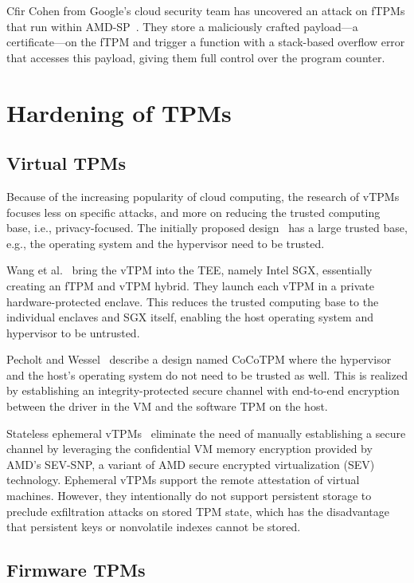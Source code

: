Cfir Cohen from Google's cloud security team has uncovered an attack on fTPMs that run within AMD-SP~\cite{cohen}. They store a maliciously crafted payload---a certificate---on the fTPM and trigger a function with a stack-based overflow error that accesses this payload, giving them full control over the program counter.

\section{Hardening of TPMs}

\subsection{Virtual TPMs}

Because of the increasing popularity of cloud computing, the research of vTPMs focuses less on specific attacks, and more on reducing the trusted computing base, i.e., privacy-focused. The initially proposed design~\cite{268868} has a large trusted base, e.g., the operating system and the hypervisor need to be trusted.

Wang et al.~\cite{Wang2019} bring the vTPM into the \ac{TEE}, namely Intel SGX, essentially creating an fTPM and vTPM hybrid. They launch each vTPM in a private hardware-protected enclave. This reduces the trusted computing base to the individual enclaves and SGX itself, enabling the host operating system and hypervisor to be untrusted.

Pecholt and Wessel~\cite{Pecholt2022} describe a design named CoCoTPM where the hypervisor and the host's operating system do not need to be trusted as well. This is realized by establishing an integrity-protected secure channel with end-to-end encryption between the driver in the VM and the software TPM on the host.

Stateless ephemeral vTPMs~\cite{Narayanan2023} eliminate the need of manually establishing a secure channel by leveraging the confidential VM memory encryption provided by AMD's SEV-SNP, a variant of AMD secure encrypted virtualization (SEV) technology.
Ephemeral vTPMs support the remote attestation of virtual machines.
However, they intentionally do not support persistent storage to preclude exfiltration attacks on stored TPM state, which has the disadvantage that persistent keys or nonvolatile indexes cannot be stored.

\subsection{Firmware TPMs}

